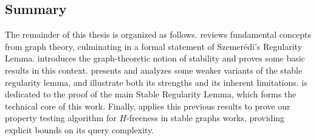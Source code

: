     \subsection{Summary} \label{subsec:summary}

        The remainder of this thesis is organized as follows.
         reviews fundamental concepts from graph theory, culminating in a formal statement of Szemer\'edi's
        Regularity Lemma.
         introduces the graph-theoretic notion of stability and proves some basic results in this context.
         presents and analyzes some weaker variants of the stable regularity lemma, and illustrate both its
        strengths and its inherent limitations.
         is dedicated to the proof of the main Stable Regularity Lemma, which forms the technical core of this
        work.
        Finally,  applies this previous results to prove our property testing algorithm for
        $H$-freeness in stable graphs works, providing explicit bounds on its query complexity.
